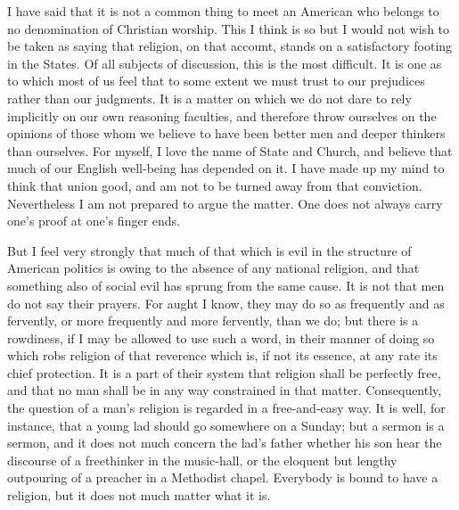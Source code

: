 I have said that it is not a common thing to meet an American who
belongs to no denomination of Christian worship.  This I think is
so but I would not wish to be taken as saying that religion, on
that account, stands on a satisfactory footing in the States.  Of
all subjects of discussion, this is the most difficult.  It is one
as to which most of us feel that to some extent we must trust to
our prejudices rather than our judgments.  It is a matter on which
we do not dare to rely implicitly on our own reasoning faculties,
and therefore throw ourselves on the opinions of those whom we
believe to have been better men and deeper thinkers than ourselves.
For myself, I love the name of State and Church, and believe that
much of our English well-being has depended on it.  I have made up
my mind to think that union good, and am not to be turned away from
that conviction.  Nevertheless I am not prepared to argue the
matter.  One does not always carry one's proof at one's finger
ends.

But I feel very strongly that much of that which is evil in the
structure of American politics is owing to the absence of any
national religion, and that something also of social evil has
sprung from the same cause.  It is not that men do not say their
prayers.  For aught I know, they may do so as frequently and as
fervently, or more frequently and more fervently, than we do; but
there is a rowdiness, if I may be allowed to use such a word, in
their manner of doing so which robs religion of that reverence
which is, if not its essence, at any rate its chief protection.  It
is a part of their system that religion shall be perfectly free,
and that no man shall be in any way constrained in that matter.
Consequently, the question of a man's religion is regarded in a
free-and-easy way.  It is well, for instance, that a young lad
should go somewhere on a Sunday; but a sermon is a sermon, and it
does not much concern the lad's father whether his son hear the
discourse of a freethinker in the music-hall, or the eloquent but
lengthy outpouring of a preacher in a Methodist chapel.  Everybody
is bound to have a religion, but it does not much matter what it
is.

